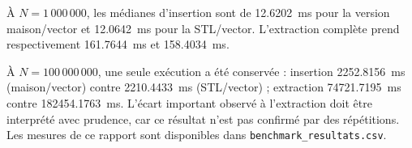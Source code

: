 \documentclass[12pt,a4paper]{article}
\begin{document}
À $N=1\,000\,000$, les médianes d'insertion sont de \SI{12.6202}{ms} pour
la version maison/vector et \SI{12.0642}{ms} pour la STL/vector. L'extraction
complète prend respectivement \SI{161.7644}{ms} et \SI{158.4034}{ms}.

À $N=100\,000\,000$, une seule exécution a été conservée : insertion
\SI{2252.8156}{ms} (maison/vector) contre \SI{2210.4433}{ms} (STL/vector) ;
extraction \SI{74721.7195}{ms} contre \SI{182454.1763}{ms}. L'écart important
observé à l'extraction doit être interprété avec prudence, car ce résultat
n'est pas confirmé par des répétitions. Les mesures de ce rapport sont
disponibles dans \texttt{benchmark\_resultats.csv}.
\end{document}
